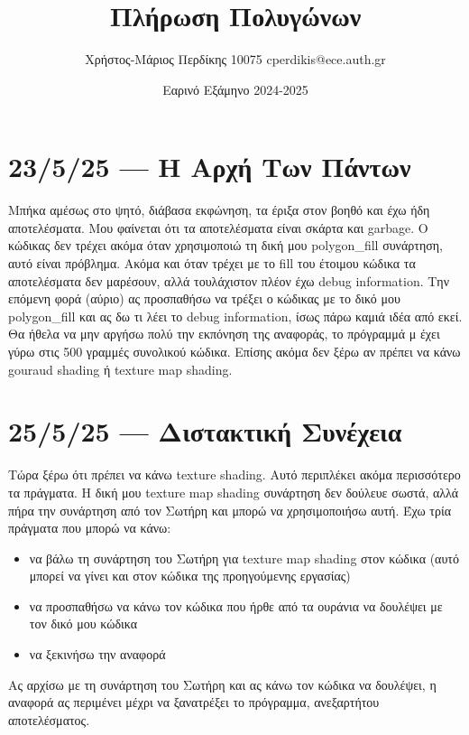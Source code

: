 \documentclass{article}
\title{Πλήρωση Πολυγώνων}
\date{Εαρινό Εξάμηνο 2024-2025}
\author{Χρήστος-Μάριος Περδίκης 10075 cperdikis@ece.auth.gr}
\begin{document}
\maketitle
\section{23/5/25 --- Η Αρχή Των Πάντων}
Μπήκα αμέσως στο ψητό, διάβασα εκφώνηση, τα έριξα στον βοηθό και έχω ήδη 
αποτελέσματα. Μου φαίνεται ότι τα αποτελέσματα είναι σκάρτα και garbage.
Ο κώδικας δεν τρέχει ακόμα όταν χρησιμοποιώ τη δική μου polygon\_fill 
συνάρτηση, αυτό είναι πρόβλημα. Ακόμα και όταν τρέχει με το fill του
έτοιμου κώδικα τα αποτελέσματα δεν μαρέσουν, αλλά τουλάχιστον πλέον έχω 
debug information. Την επόμενη φορά (αύριο) ας προσπαθήσω να τρέξει ο
κώδικας με το δικό μου polygon\_fill και ας δω τι λέει το debug information,
ίσως πάρω καμιά ιδέα από εκεί. Θα ήθελα να μην αργήσω πολύ την εκπόνηση της 
αναφοράς, το πρόγραμμά μ έχει γύρω στις 500 γραμμές συνολικού κώδικα. Επίσης
ακόμα δεν ξέρω αν πρέπει να κάνω gouraud shading ή texture map shading.

\section{25/5/25 --- Διστακτική Συνέχεια}
Τώρα ξέρω ότι πρέπει να κάνω texture shading. Αυτό περιπλέκει ακόμα περισσότερο
τα πράγματα. Η δική μου texture map shading συνάρτηση δεν δούλευε σωστά, αλλά
πήρα την συνάρτηση από τον Σωτήρη και μπορώ να χρησιμοποιήσω αυτή. Έχω τρία πράγματα 
που μπορώ να κάνω:

\begin{itemize}
    \item να βάλω τη συνάρτηση του Σωτήρη για texture map shading στον κώδικα 
        (αυτό μπορεί να γίνει και στον κώδικα της προηγούμενης εργασίας)
    \item να προσπαθήσω να κάνω τον κώδικα που ήρθε από τα ουράνια να δουλέψει 
        με τον δικό μου κώδικα
    \item να ξεκινήσω την αναφορά
\end{itemize}

Ας αρχίσω με τη συνάρτηση του Σωτήρη και ας κάνω τον κώδικα να δουλέψει,
η αναφορά ας περιμένει μέχρι να ξανατρέξει το πρόγραμμα, ανεξαρτήτου 
αποτελέσματος.
\end{document}
